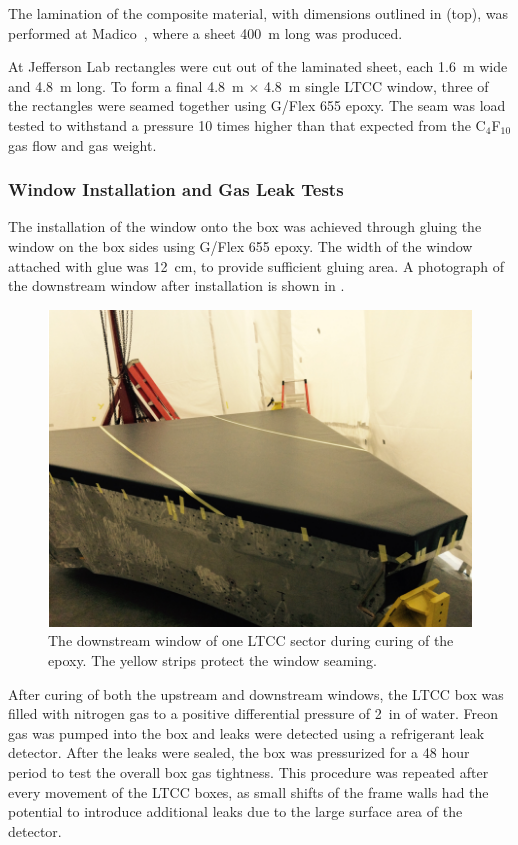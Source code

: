 The lamination of the composite material, with dimensions outlined in  (top), was performed at
Madico~\cite{madico}, where a sheet 400~m long was produced.

At Jefferson Lab rectangles were cut out of the laminated sheet, each 1.6~m wide and 4.8~m long. To form a final
4.8~m $\times$ 4.8~m single LTCC window, three of the rectangles were seamed together using G/Flex 655 epoxy.
The seam was load tested to withstand a pressure 10 times higher than that expected from the C$_4$F$_{10}$ gas flow and gas weight.

\subsubsection{Window Installation and Gas Leak Tests}

The installation of the window onto the box was achieved through gluing the window on the box sides using G/Flex 655
epoxy. The width of the window attached with glue was 12~cm, to provide sufficient gluing area. A photograph of the
downstream window after installation is shown in .

\begin{figure}
	\centering
	\includegraphics[width=1.0\columnwidth,keepaspectratio]{img/downstreamWindow.png}
	\caption{The downstream window of one LTCC sector during curing of the epoxy. The yellow strips protect the
          window seaming.}
	\label{fig:downstreamWindow}
\end{figure}

After curing of both the upstream and downstream windows, the LTCC box was filled with nitrogen gas to a
positive differential pressure of
2~in of water. Freon gas was pumped into the box and leaks were detected using a refrigerant leak detector. After the
leaks were sealed, the box was pressurized for a 48 hour period to test the overall box gas tightness. This procedure
was repeated after every movement of the LTCC boxes, as small shifts of the frame walls had the potential to introduce
additional leaks due to the large surface area of the detector.
